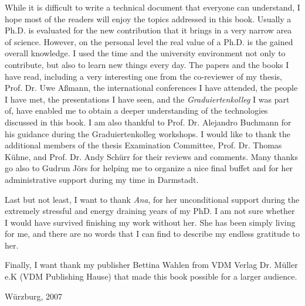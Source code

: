 While it is difficult to write a technical document that everyone can understand, I hope most of the readers will enjoy the topics addressed in this book. Usually a Ph.D. is evaluated for the new contribution that it brings in a very narrow area of science. However, on the personal level the real value of a Ph.D. is the gained overall knowledge. I used the time and the university environment not only to contribute, but also to learn new things every day. The papers and the books I have read, including a very interesting one from the co-reviewer of my thesis, Prof. Dr. Uwe A{\ss}mann, the international conferences I have attended, the people I have met, the presentations I have seen, and the \textit{Graduiertenkolleg} I was part of, have enabled me to obtain a deeper understanding of the technologies discussed in this book. I am also thankful to Prof. Dr. Alejandro Buchmann for his guidance during the Graduiertenkolleg workshops. I would like to thank the additional members of the thesis Examination Committee, Prof. Dr. Thomas K\"{u}hne, and Prof. Dr. Andy Sch\"{u}rr for their reviews and comments. Many thanks go also to  Gudrun J\"{o}rs for helping me to organize a nice final buffet and for her administrative support during my time in Darmstadt.

Last but not least, I want to thank \textit{Ana}, for her unconditional support during the extremely stressful and energy draining years of my PhD. I am not sure whether I would have survived finishing my work without her. She has been simply living for me, and there are no words that I can find to describe my endless gratitude to her.

Finally, I want thank my publisher Bettina Wahlen from VDM Verlag Dr. M\"{u}ller e.K (VDM Publishing Hause) that made this book possible for a larger audience.

\vspace{0.5cm}
\noindent W\"{u}rzburg, 2007